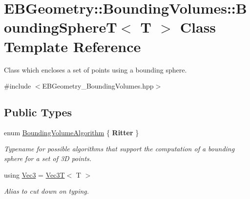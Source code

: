 \hypertarget{classEBGeometry_1_1BoundingVolumes_1_1BoundingSphereT}{}\section{E\+B\+Geometry\+:\+:Bounding\+Volumes\+:\+:Bounding\+SphereT$<$ T $>$ Class Template Reference}
\label{classEBGeometry_1_1BoundingVolumes_1_1BoundingSphereT}


Class which encloses a set of points using a bounding sphere.  




{\ttfamily \#include $<$E\+B\+Geometry\+\_\+\+Bounding\+Volumes.\+hpp$>$}

\subsection*{Public Types}
\begin{DoxyCompactItemize}
\item 
\mbox{\label{classEBGeometry_1_1BoundingVolumes_1_1BoundingSphereT_ae80a2de96c8230589e4ea05fa9943946}} 
enum \hyperlink{classEBGeometry_1_1BoundingVolumes_1_1BoundingSphereT_ae80a2de96c8230589e4ea05fa9943946}{Bounding\+Volume\+Algorithm} \{ {\bfseries Ritter}
 \}\begin{DoxyCompactList}\small\item\em Typename for possible algorithms that support the computation of a bounding sphere for a set of 3D points. \end{DoxyCompactList}
\item 
\mbox{\label{classEBGeometry_1_1BoundingVolumes_1_1BoundingSphereT_a65cef119542a4c7c1cabb1ea36f40336}} 
using \hyperlink{classEBGeometry_1_1BoundingVolumes_1_1BoundingSphereT_a65cef119542a4c7c1cabb1ea36f40336}{Vec3} = \hyperlink{classVec3T}{Vec3T}$<$ T $>$
\begin{DoxyCompactList}\small\item\em Alias to cut down on typing. \end{DoxyCompactList}\end{DoxyCompactItemize}
